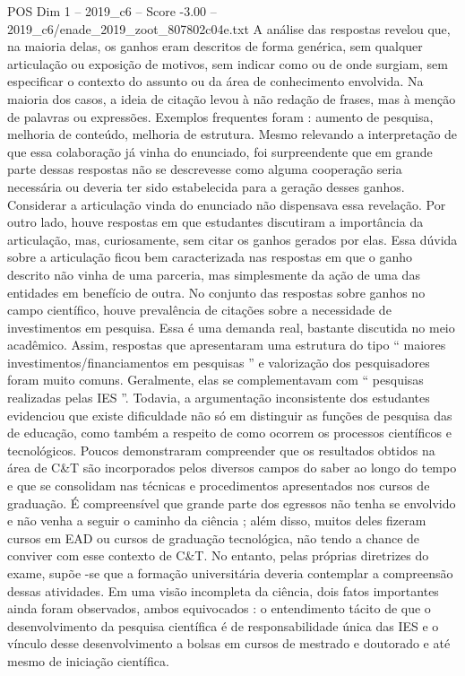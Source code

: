 \begin{textsample}{POS Dim 1 – 2019\_c6 – Score -3.00 – 2019\_c6/enade\_2019\_zoot\_807802c04e.txt}
A análise das respostas revelou que, na maioria delas, os ganhos eram descritos de forma genérica, sem qualquer articulação ou exposição de motivos, sem indicar como ou de onde surgiam, sem especificar o contexto do assunto ou da área de conhecimento envolvida.
Na maioria dos casos, a ideia de citação levou à não redação de frases, mas à menção de palavras ou expressões.
Exemplos frequentes foram : aumento de pesquisa, melhoria de conteúdo, melhoria de estrutura.
Mesmo relevando a interpretação de que essa colaboração já vinha do enunciado, foi surpreendente que em grande parte dessas respostas não se descrevesse como alguma cooperação seria necessária ou deveria ter sido estabelecida para a geração desses ganhos.
Considerar a articulação vinda do enunciado não dispensava essa revelação.
Por outro lado, houve respostas em que estudantes discutiram a importância da articulação, mas, curiosamente, sem citar os ganhos gerados por elas.
Essa dúvida sobre a articulação ficou bem caracterizada nas respostas em que o ganho descrito não vinha de uma parceria, mas simplesmente da ação de uma das entidades em benefício de outra.
No conjunto das respostas sobre ganhos no campo científico, houve prevalência de citações sobre a necessidade de investimentos em pesquisa.
Essa é uma demanda real, bastante discutida no meio acadêmico.
Assim, respostas que apresentaram uma estrutura do tipo “ maiores investimentos/financiamentos em pesquisas ” e valorização dos pesquisadores foram muito comuns.
Geralmente, elas se complementavam com “ pesquisas realizadas pelas IES ”.
Todavia, a argumentação inconsistente dos estudantes evidenciou que existe dificuldade não só em distinguir as funções de pesquisa das de educação, como também a respeito de como ocorrem os processos científicos e tecnológicos.
Poucos demonstraram compreender que os resultados obtidos na área de C\&T são incorporados pelos diversos campos do saber ao longo do tempo e que se consolidam nas técnicas e procedimentos apresentados nos cursos de graduação.
É compreensível que grande parte dos egressos não tenha se envolvido e não venha a seguir o caminho da ciência ; além disso, muitos deles fizeram cursos em EAD ou cursos de graduação tecnológica, não tendo a chance de conviver com esse contexto de C\&T.
No entanto, pelas próprias diretrizes do exame, supõe -se que a formação universitária deveria contemplar a compreensão dessas atividades.
Em uma visão incompleta da ciência, dois fatos importantes ainda foram observados, ambos equivocados : o entendimento tácito de que o desenvolvimento da pesquisa científica é de responsabilidade única das IES e o vínculo desse desenvolvimento a bolsas em cursos de mestrado e doutorado e até mesmo de iniciação científica.

\end{textsample}
